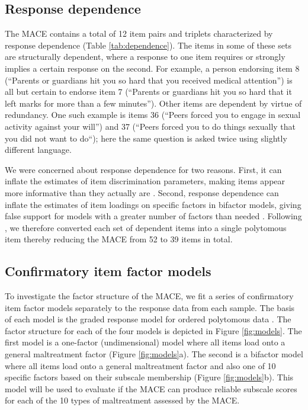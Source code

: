 \documentclass[letterpaper,man,natbib,floatsintext,longtable]{apa6}
\begin{document}
\subsection{Response dependence}

The MACE contains a total of 12 item pairs and triplets characterized by response dependence (Table \ref{tab:dependence}). The items in some of these sets are structurally dependent, where a response to one item requires or strongly implies a certain response on the second. For example, a person endorsing item 8 (``Parents or guardians hit you so hard that you received medical attention'') is all but certain to endorse item 7 (``Parents or guardians hit you so hard that it left marks for more than a few minutes''). Other items are dependent by virtue of redundancy. One such example is items 36 (``Peers forced you to engage in sexual activity against your will'') and 37 (``Peers forced you to do things sexually that you did not want to do``); here the same question is asked twice using slightly different language.

We were concerned about response dependence for two reasons. First, it can inflate the estimates of item discrimination parameters, making items appear more informative than they actually are \citep{marais2008formalizing}. Second, response dependence can inflate the estimates of item loadings on specific factors in bifactor models, giving false support for models with a greater number of factors than needed \citep{reise2013applying}. Following \cite{marais2008formalizing}, we therefore converted each set of dependent items into a single polytomous item thereby reducing the MACE from 52 to 39 items in total.

\subsection{Confirmatory item factor models}

To investigate the factor structure of the MACE, we fit a series of confirmatory item factor models separately to the response data from each sample. The basis of each model is the graded response model for ordered polytomous data \citep{samejima1997graded}. The factor structure for each of the four models is depicted in Figure \ref{fig:models}. The first model is a one-factor (undimensional) model where all items load onto a general maltreatment factor (Figure \ref{fig:models}a). The second is a bifactor model where all items load onto a general maltreatment factor and also one of 10 specific factors based on their subscale membership (Figure \ref{fig:models}b). This model will be used to evaluate if the MACE can produce reliable subscale scores for each of the 10 types of maltreatment assessed by the MACE. 
\end{document}
